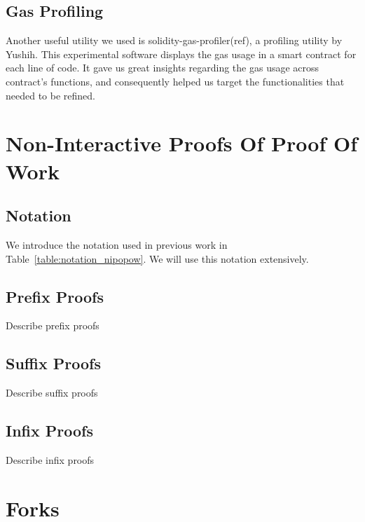 
\subsection{Gas Profiling}

Another useful utility we used is solidity-gas-profiler(ref), a profiling
utility by Yushih. This experimental software displays the gas usage in a smart
contract for each line of code. It gave us great insights regarding the gas
usage across contract’s functions, and consequently helped us target the
functionalities that needed to be refined.


\section{Non-Interactive Proofs Of Proof Of Work}

\subsection{Notation}

We introduce the notation used in previous work in
Table~\ref{table:notation_nipopow}. We will use this notation extensively.




\subsection{Prefix Proofs}

Describe prefix proofs

\subsection{Suffix Proofs}

Describe suffix proofs

\subsection{Infix Proofs}

Describe infix proofs

\section{Forks}

